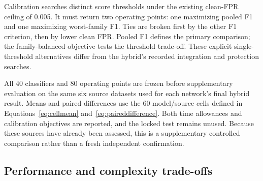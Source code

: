 Calibration searches distinct score thresholds under the existing clean-FPR ceiling of 0.005. It must return two operating points: one maximizing pooled F1 and one maximizing worst-family F1. Ties are broken first by the other F1 criterion, then by lower clean FPR. Pooled F1 defines the primary comparison; the family-balanced objective tests the threshold trade-off. These explicit single-threshold alternatives differ from the hybrid's recorded integration and protection searches.

All 40 classifiers and 80 operating points are frozen before supplementary evaluation on the same six source datasets used for each network's final hybrid result. Means and paired differences use the 60 model/source cells defined in Equations~\ref{eq:cellmean} and~\ref{eq:paireddifference}. Both time allowances and calibration objectives are reported, and the locked test remains unused. Because these sources have already been assessed, this is a supplementary controlled comparison rather than a fresh independent confirmation.

\subsection{Performance and complexity trade-offs}

